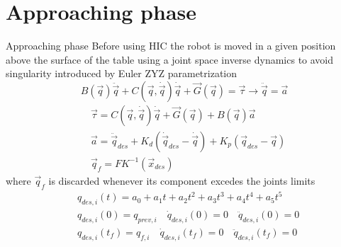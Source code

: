 \section{Approaching phase}
\begin{frame}{Approaching phase}
  Before using HIC the robot is moved in a given position above the surface of the table using a joint space inverse dynamics
  to avoid singularity introduced by Euler ZYZ parametrization
  \[
  B(\vec{q}) \ddot{\vec{q}} + C(\vec{q}, \dot{\vec{q}}) \dot{\vec{q}} + \vec{G}(\vec{q}) = \vec{\tau}
  \longrightarrow \ddot{\vec{q}} = \vec{a}
  \]
  \[
  \begin{split}
    &\vec{\tau} = C(\vec{q}, \dot{\vec{q}}) \dot{\vec{q}} + \vec{G}(\vec{q})  +  B(\vec{q}) \vec{a}\\
    &\vec{a} = \ddot{\vec{q}}_{des} + K_d(\dot{\vec{q}}_{des} - \dot{\vec{q}}) + K_p(\vec{q}_{des} - \vec{q})\\
    &\vec{q}_{f} = FK^{-1}(\vec{x}_{des})
  \end{split}
  \]
  where $\vec{q}_f$ is discarded whenever its component excedes the joints limits
  \[
  \begin{split}
    &q_{des, i}(t) = a_0 + a_1 t + a_2 t^2 + a_3 t^3 + a_4 t^4 + a_5 t^5\\
    &q_{des, i}(0) = q_{prev,i} \quad \dot{q}_{des, i}(0) = 0 \quad \ddot{q}_{des, i}(0) = 0\\
    &q_{des, i}(t_f) = q_{f,i} \quad \dot{q}_{des, i}(t_f) = 0 \quad \ddot{q}_{des, i}(t_f) = 0
  \end{split}
  \]
\end{frame}
